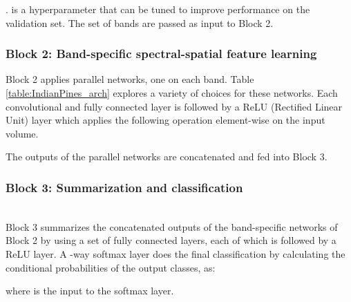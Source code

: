 \documentclass[journal]{IEEEtran}
\begin{document}
.  is a hyperparameter that can be tuned to improve performance on the validation set. The set of bands  are passed as input to Block 2.\\

\subsubsection{Block 2: Band-specific spectral-spatial feature learning}\hfill 

Block 2 applies  parallel networks, one on each band. Table \ref{table:IndianPines_arch} explores a variety of choices for these networks. Each convolutional and fully connected layer is followed by a ReLU (Rectified Linear Unit) layer \cite{Xavier:2011} which applies the following operation element-wise on the input volume.
 
The outputs of the parallel networks are concatenated and fed into Block 3. \\

\subsubsection{Block 3: Summarization and classification}\hfill \\

Block 3 summarizes the concatenated outputs of the band-specific networks of Block 2 by using a set of fully connected layers, each of which is followed by a ReLU layer. A -way softmax layer does the final classification by calculating the conditional probabilities of the  output classes,  as:

where  is the input to the softmax layer.
\end{document}
